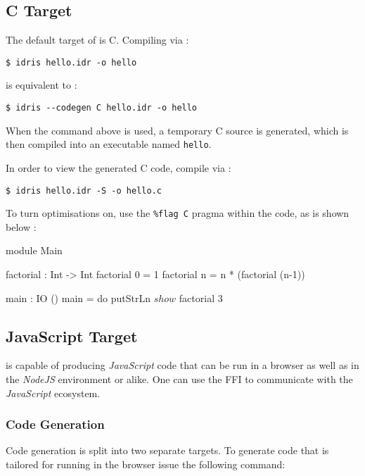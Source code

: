 \subsection{C Target}

The default target of \Idris{} is C. Compiling via : 

\begin{lstlisting}[style=stdout]
$ idris hello.idr -o hello
\end{lstlisting}

\noindent
is equivalent to : 

\begin{lstlisting}[style=stdout]
$ idris --codegen C hello.idr -o hello
\end{lstlisting}

\noindent
When the command above is used, a temporary C
source is generated, which is then compiled into 
an executable named \texttt{hello}.  

\noindent
In order to view the generated C code, compile 
via : 

\begin{lstlisting}[style=stdout]
$ idris hello.idr -S -o hello.c
\end{lstlisting}

\noindent
To turn optimisations on,  use the \texttt{\%flag C} 
pragma within the code, as is shown below : 

\begin{code}
module Main

factorial : Int -> Int
factorial 0 = 1
factorial n = n * (factorial (n-1))

main : IO ()
main = do      
     putStrLn $ show $ factorial 3
\end{code}

\subsection{JavaScript Target}

\Idris{} is capable of producing \emph{JavaScript} code that can be run in a browser as well as in the \emph{NodeJS} environment or alike.
One can use the FFI to communicate with the \emph{JavaScript} ecosystem.

\subsubsection*{Code Generation}

\noindent
Code generation is split into two separate targets.
To generate code that is tailored for running in the browser issue the following command:


